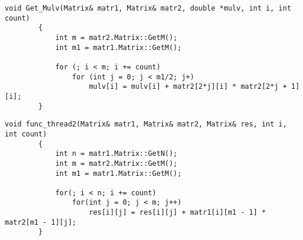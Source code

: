 \documentclass[a4paper, 14pt]{article}
\begin{document}
		\begin{lstlisting}[label=some-code,caption=Этап 2(вычисление mulv) в алгоритме Винограда]
		void Get_Mulv(Matrix& matr1, Matrix& matr2, double *mulv, int i, int count)
		{
			int m = matr2.Matrix::GetM();
			int m1 = matr1.Matrix::GetM();

			for (; i < m; i += count)
				for (int j = 0; j < m1/2; j+)
					mulv[i] = mulv[i] + matr2[2*j][i] * matr2[2*j + 1][i];
		}
		\end{lstlisting}
		\newpage
		\begin{lstlisting}[label=some-code,caption=Этап 4(дополнительные вычисления) в алгоритме Винограда]
		void func_thread2(Matrix& matr1, Matrix& matr2, Matrix& res, int i, int count)
		{
			int n = matr1.Matrix::GetN();
			int m = matr2.Matrix::GetM();
			int m1 = matr1.Matrix::GetM();

			for(; i < n; i += count)
				for(int j = 0; j < m; j++)
					res[i][j] = res[i][j] + matr1[i][m1 - 1] * matr2[m1 - 1][j];
		}
		\end{lstlisting}
		
\end{document}
